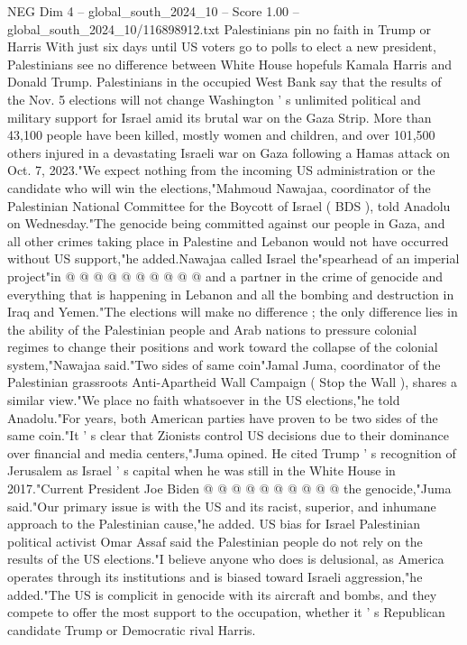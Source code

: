 \begin{textsample}{NEG Dim 4 – global\_south\_2024\_10 – Score 1.00 – global\_south\_2024\_10/116898912.txt}  \label{ex:f4_neg_070}
Palestinians pin no faith in Trump or Harris With just six days until US voters go to polls to elect a new president, Palestinians see no difference between White House hopefuls Kamala Harris and Donald Trump.
Palestinians in the occupied West Bank say that the results of the Nov. 5 elections will not change Washington ' s unlimited political and military support for Israel amid its brutal war on the Gaza Strip.
More than 43,100 people have been killed, mostly women and children, and over 101,500 others injured in a devastating Israeli war on Gaza following a Hamas attack on Oct. 7, 2023."We expect nothing from the incoming US administration or the candidate who will win the elections,"Mahmoud Nawajaa, coordinator of the Palestinian National Committee for the Boycott of Israel ( BDS ), told Anadolu on Wednesday."The genocide being committed against our people in Gaza, and all other crimes taking place in Palestine and Lebanon would not have occurred without US support,"he added.Nawajaa called Israel the"spearhead of an imperial project"in @ @ @ @ @ @ @ @ @ @ and a partner in the crime of genocide and everything that is happening in Lebanon and all the bombing and destruction in Iraq and Yemen."The elections will make no difference ; the only difference lies in the ability of the Palestinian people and Arab nations to pressure colonial regimes to change their positions and work toward the collapse of the colonial system,"Nawajaa said."Two sides of same coin"Jamal Juma, coordinator of the Palestinian grassroots Anti-Apartheid Wall Campaign ( Stop the Wall ), shares a similar view."We place no faith whatsoever in the US elections,"he told Anadolu."For years, both American parties have proven to be two sides of the same coin."It ' s clear that Zionists control US decisions due to their dominance over financial and media centers,"Juma opined.
He cited Trump ' s recognition of Jerusalem as Israel ' s capital when he was still in the White House in 2017."Current President Joe Biden @ @ @ @ @ @ @ @ @ @ the genocide,"Juma said."Our primary issue is with the US and its racist, superior, and inhumane approach to the Palestinian cause,"he added.
US bias for Israel Palestinian political activist Omar Assaf said the Palestinian people do not rely on the results of the US elections."I believe anyone who does is delusional, as America operates through its institutions and is biased toward Israeli aggression,"he added."The US is complicit in genocide with its aircraft and bombs, and they compete to offer the most support to the occupation, whether it ' s Republican candidate Trump or Democratic rival Harris.

\end{textsample}
